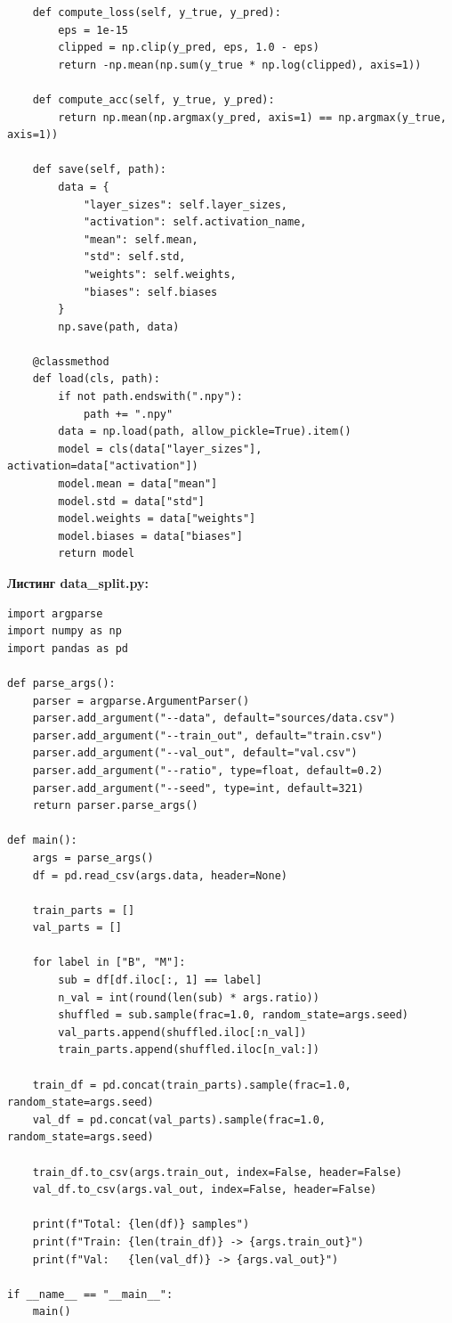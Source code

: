 \documentclass[a4paper,14pt]{extarticle}
\begin{document}
\begin{lstlisting}
    def compute_loss(self, y_true, y_pred):
        eps = 1e-15
        clipped = np.clip(y_pred, eps, 1.0 - eps)
        return -np.mean(np.sum(y_true * np.log(clipped), axis=1))

    def compute_acc(self, y_true, y_pred):
        return np.mean(np.argmax(y_pred, axis=1) == np.argmax(y_true, axis=1))

    def save(self, path):
        data = {
            "layer_sizes": self.layer_sizes,
            "activation": self.activation_name,
            "mean": self.mean,
            "std": self.std,
            "weights": self.weights,
            "biases": self.biases
        }
        np.save(path, data)

    @classmethod
    def load(cls, path):
        if not path.endswith(".npy"):
            path += ".npy"
        data = np.load(path, allow_pickle=True).item()
        model = cls(data["layer_sizes"], activation=data["activation"])
        model.mean = data["mean"]
        model.std = data["std"]
        model.weights = data["weights"]
        model.biases = data["biases"]
        return model
\end{lstlisting}

\newpage
\textbf{Листинг data\_split.py:}
\begin{lstlisting}
import argparse
import numpy as np
import pandas as pd

def parse_args():
    parser = argparse.ArgumentParser()
    parser.add_argument("--data", default="sources/data.csv")
    parser.add_argument("--train_out", default="train.csv")
    parser.add_argument("--val_out", default="val.csv")
    parser.add_argument("--ratio", type=float, default=0.2)
    parser.add_argument("--seed", type=int, default=321)
    return parser.parse_args()

def main():
    args = parse_args()
    df = pd.read_csv(args.data, header=None)

    train_parts = []
    val_parts = []

    for label in ["B", "M"]:
        sub = df[df.iloc[:, 1] == label]
        n_val = int(round(len(sub) * args.ratio))
        shuffled = sub.sample(frac=1.0, random_state=args.seed)
        val_parts.append(shuffled.iloc[:n_val])
        train_parts.append(shuffled.iloc[n_val:])

    train_df = pd.concat(train_parts).sample(frac=1.0, random_state=args.seed)
    val_df = pd.concat(val_parts).sample(frac=1.0, random_state=args.seed)

    train_df.to_csv(args.train_out, index=False, header=False)
    val_df.to_csv(args.val_out, index=False, header=False)

    print(f"Total: {len(df)} samples")
    print(f"Train: {len(train_df)} -> {args.train_out}")
    print(f"Val:   {len(val_df)} -> {args.val_out}")

if __name__ == "__main__":
    main()
\end{lstlisting}
\end{document}
